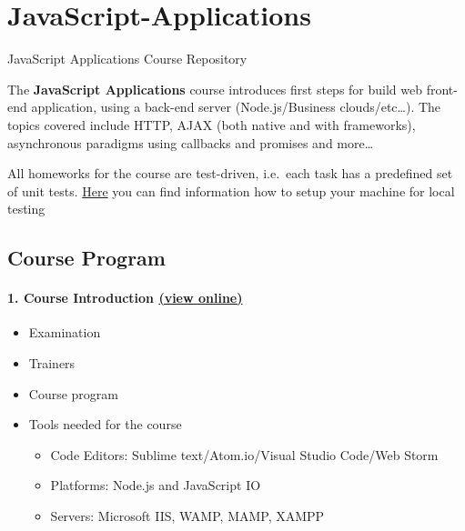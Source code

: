\section{JavaScript-Applications}\label{javascript-applications}

JavaScript Applications Course Repository

The \textbf{JavaScript Applications} course introduces first steps for
build web front-end application, using a back-end server
(Node.js/Business clouds/etc\ldots{}). The topics covered include HTTP,
AJAX (both native and with frameworks), asynchronous paradigms using
callbacks and promises and more\ldots{}

All homeworks for the course are test-driven, i.e.~each task has a
predefined set of unit tests.
\href{https://github.com/TelerikAcademy/JavaScript-UI-and-DOM/blob/master/README.md\#user-content-preparing-the-local-machine-for-unit-testing-with-mocha-and-chai}{Here}
you can find information how to setup your machine for local testing

\subsection{Course Program}\label{course-program}

\paragraph{\texorpdfstring{1. Course Introduction
\href{https://rawgit.com/TelerikAcademy/JavaScript-Applications/master/01.\%20Javascript\%20Applications\%20-\%20Course\%20Introduction/slides/index.html}{(view
online)}}{1. Course Introduction (view online)}}\label{course-introduction-view-online}

\begin{itemize}
\tightlist
\item
  Examination
\item
  Trainers
\item
  Course program
\item
  Tools needed for the course

  \begin{itemize}
  \tightlist
  \item
    Code Editors: Sublime text/Atom.io/Visual Studio Code/Web Storm
  \item
    Platforms: Node.js and JavaScript IO
  \item
    Servers: Microsoft IIS, WAMP, MAMP, XAMPP
  \end{itemize}
\end{itemize}

